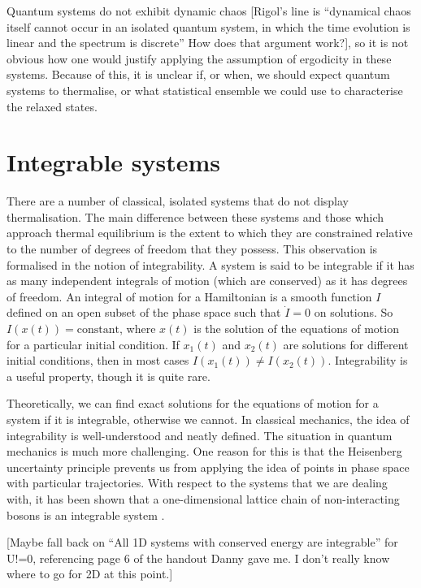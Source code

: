 \documentclass[a4paper, 10pt]{article}
\theoremstyle{plain}
\begin{document}
Quantum systems do not  exhibit dynamic chaos  [Rigol's line is ``dynamical chaos itself cannot occur in an isolated
quantum system, in which the time evolution is linear and the spectrum is
discrete'' How does that argument work?], so it is not obvious how one would
justify applying the assumption of ergodicity in these systems. Because of
this, it is unclear if, or when, we should expect quantum systems to
thermalise, or what statistical ensemble we could use to characterise the
relaxed states.


\section{Integrable systems}

There are a number of classical, isolated systems that do not display
thermalisation. The main difference between these systems and those which
approach thermal equilibrium is the extent to which they are constrained
relative to the number of degrees of freedom that they possess. This observation
is formalised in the notion of integrability. A system is said to be integrable
if it has  as
many independent integrals of motion (which are conserved) as it has degrees
of freedom. An integral of motion for a Hamiltonian is a smooth function
$I$ defined on an open subset of the phase space such that $\dot{I}=0$ on
solutions. So $I(x(t))=\text{constant}$, where $x(t)$ is the solution of the
equations of motion for a particular initial condition. If $x_1(t)$ and
$x_2(t)$ are solutions for different initial conditions, then in most cases
$I(x_1(t))\ne I(x_2(t))$. Integrability is a useful property, though it is
quite rare.

Theoretically, we can find exact solutions for the equations of motion for a
system if it is integrable, otherwise we cannot. In classical mechanics, the
idea of integrability is well-understood and neatly defined. The situation in
quantum mechanics is much more challenging. One reason for this is that
the Heisenberg uncertainty principle prevents us from applying the idea of
points in phase space with particular trajectories. With respect to the systems
that we are dealing with, it has been shown that a one-dimensional lattice
chain of non-interacting bosons is an integrable system \cite{Rigol2007}.

 [Maybe fall back on ``All 1D systems with conserved
energy are integrable'' for U!=0, referencing page 6 of the handout Danny gave
me. I don't really know where to go for 2D at this point.]
\end{document}
